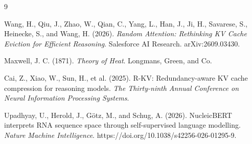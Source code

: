 \documentclass[11pt]{article}
\begin{document}

\begin{thebibliography}{9}

Wang, H., Qiu, J., Zhao, W., Qian, C., Yang, L., Han, J., Ji, H., Savarese, S., Heinecke, S., and Wang, H. (2026).
\textit{Random Attention: Rethinking KV Cache Eviction for Efficient Reasoning}.
Salesforce AI Research. arXiv:2609.03430.

Maxwell, J. C. (1871). \textit{Theory of Heat}. Longmans, Green, and Co.

Cai, Z., Xiao, W., Sun, H., et al. (2025).
R-KV: Redundancy-aware KV cache compression for reasoning models.
\textit{The Thirty-ninth Annual Conference on Neural Information Processing Systems}.

Upadhyay, U., Herold, J., G\"otz, M., and Schug, A. (2026).
NucleicBERT interprets RNA sequence space through self-supervised language modelling.
\textit{Nature Machine Intelligence}. https://doi.org/10.1038/s42256-026-01295-9.

\end{thebibliography}
\end{document}
